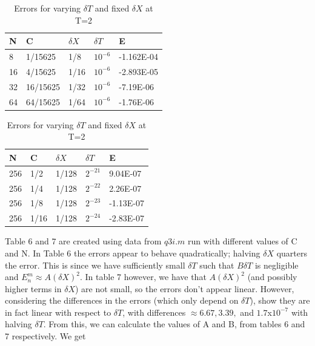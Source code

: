 \documentclass[10pt,a4paper]{report}
\begin{document}
\begin{table}[h]
\begin{minipage}[b]{0.5\linewidth}
\centering

\begin{tabular}{|l|l|l|l|l|}
\hline
N  & C        & $\delta X$ & $\delta T$ & E          \\ \hline
8  & 1/15625  & 1/8        & $10^{-6}$    & -1.162E-04 \\ \hline
16 & 4/15625  & 1/16       & $10^{-6}$    & -2.893E-05 \\ \hline
32 & 16/15625 & 1/32       & $10^{-6}$    & -7.19E-06  \\ \hline
64 & 64/15625 & 1/64       & $10^{-6}$    & -1.76E-06  \\ \hline
\end{tabular}


\caption{Errors for varying $\delta X$ and fixed $\delta T$ at T=2}
\end{minipage}
\hspace{0.5cm}
\begin{minipage}[b]{0.5\linewidth}
\centering


\begin{tabular}{|l|l|l|l|l|}
\hline
N   & C    & $\delta X$ & $\delta T$ & E         \\ \hline
256 & 1/2  & 1/128      & $2^{-21}$      & 9.04E-07  \\ \hline
256 & 1/4  & 1/128      & $2^{-22}$     & 2.26E-07  \\ \hline
256 & 1/8  & 1/128      & $2^{-23}$      & -1.13E-07 \\ \hline
256 & 1/16 & 1/128      & $2^{-24}$      & -2.83E-07 \\ \hline
\end{tabular}

\caption{Errors for varying $\delta T$ and fixed $\delta X$ at T=2}
\end{minipage}
\end{table}

Table 6 and 7 are created using data from $q3i.m$ run with different values of C and N. In Table 6 the errors appear to behave quadratically; halving $\delta X$ quarters the error. This is since we have sufficiently small $\delta T$ such that $B\delta T$ is negligible and $E_n^m \approx A(\delta X)^2$. In table 7 however, we have that $A(\delta X)^2$ (and possibly higher terms in $\delta X$) are not small, so the errors don't appear linear. However, considering the differences in the errors (which only depend on $\delta T$), show they are in fact linear with respect to $\delta T$, with differences $\approx6.67,3.39,$ and $1.7$x$10^{-7}$ with halving $\delta T$. From this, we can calculate the values of A and B, from tables 6 and 7 respectively. We get
\end{document}
